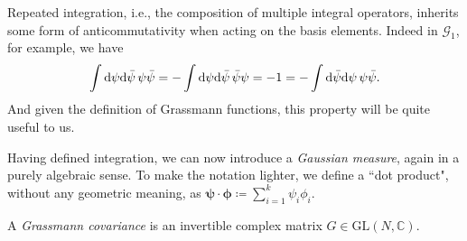 \begin{remark}
	Repeated integration, i.e., the composition of multiple integral operators, inherits some form of
	anticommutativity when acting on the basis elements. Indeed in $\mathcal{G}_1$, for example, we have
	\begin{align}
		\label{anticommuting-integrals}
		\int\mathrm{d}\psi\mathrm{d}\bar\psi\,\psi\bar\psi
		= -\int\mathrm{d}\psi\mathrm{d}\bar\psi\,\bar\psi\psi = -1 = -\int\mathrm{d}\bar\psi\mathrm{d}\psi\,\psi\bar\psi.
	\end{align}
	And given the definition of Grassmann functions, this property will be quite useful to us.
\end{remark}

Having defined integration, we can now introduce a \textit{Gaussian measure}, again in a purely
algebraic sense. To make the notation lighter, we define a ``dot product", without any geometric
meaning, as $\boldsymbol{\psi}\cdot\boldsymbol{\phi} \coloneq \sum_{i = 1}^k \psi_i\phi_i$.

\begin{definition}
	A \textit{Grassmann covariance} is an invertible complex matrix
	$G\in\mathrm{GL}(N,\mathbb{C})$.
\end{definition}

